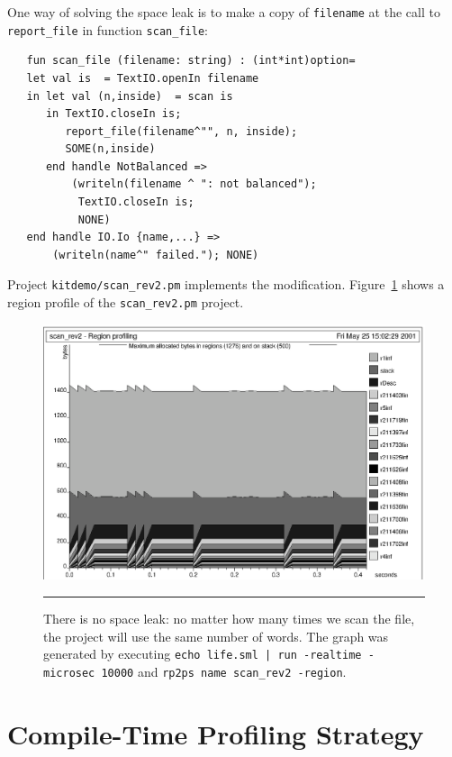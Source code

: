 \documentclass[12pt]{book}
\begin{document}
One way of solving the space leak is to make a copy of {\tt filename}
at the call to {\tt report\_file} in function {\tt scan\_file}:
\begin{verbatim}
   fun scan_file (filename: string) : (int*int)option=
   let val is  = TextIO.openIn filename 
   in let val (n,inside)  = scan is
      in TextIO.closeIn is; 
         report_file(filename^"", n, inside);
         SOME(n,inside)
      end handle NotBalanced => 
          (writeln(filename ^ ": not balanced");
           TextIO.closeIn is;
           NONE)
   end handle IO.Io {name,...} => 
       (writeln(name^" failed."); NONE)
\end{verbatim}
Project 
%
{\tt kitdemo/scan\_rev2.pm} implements the modification.
Figure~\ref{scan_rev2_1.fig} shows a region profile of the
\texttt{scan\_rev2.pm} project.
\begin{figure}
\begin{center}
\includegraphics{scan_rev2_1.ps}
\end{center}
\caption{There is no space leak: no matter how many times we scan the
  file, the project will use the same number of words. The graph was
  generated by executing \texttt{echo life.sml | run -realtime -microsec 10000} and \texttt{rp2ps
    name scan\_rev2 -region}.}
\label{scan_rev2_1.fig}
\medskip\hrule
\end{figure}

\section{Compile-Time Profiling Strategy}
\end{document}

